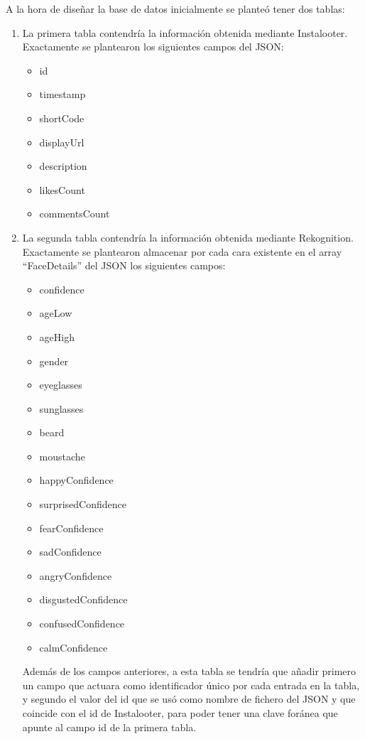 A la hora de diseñar la base de datos inicialmente se planteó tener dos tablas:

\begin{enumerate}
    \item La primera tabla contendría la información obtenida mediante Instalooter. Exactamente se plantearon los siguientes campos del JSON:
    \begin{multicols}{2}
    \begin{itemize}
        \item id
        \item timestamp
        \item shortCode
        \item displayUrl
        \item description
        \item likesCount
        \item commentsCount
    \end{itemize}
    \end{multicols}
    \item La segunda tabla contendría la información obtenida mediante Rekognition. Exactamente se plantearon almacenar por cada cara existente en el array ``FaceDetails'' del JSON los siguientes campos:
    \begin{multicols}{2}
    \begin{itemize}
        \item confidence
        \item ageLow
        \item ageHigh
        \item gender
        \item eyeglasses
        \item sunglasses
        \item beard
        \item moustache
        \item happyConfidence
        \item surprisedConfidence
        \item fearConfidence
        \item sadConfidence
        \item angryConfidence
        \item disgustedConfidence
        \item confusedConfidence
        \item calmConfidence
    \end{itemize}
    \end{multicols}
    Además de los campos anteriores, a esta tabla se tendría que añadir primero un campo que actuara como identificador único por cada entrada en la tabla, y segundo el valor del id que se usó como nombre de fichero del JSON y que coincide con el id de Instalooter, para poder tener una clave foránea que apunte al campo id de la primera tabla.
\end{enumerate}

